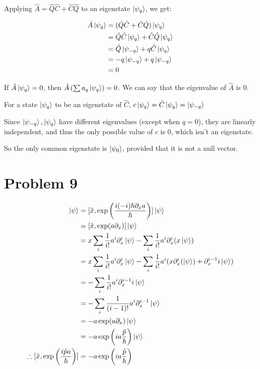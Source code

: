 \documentclass[12pt]{article}
\begin{document}
Applying $\hat{A}=\hat{Q}\hat{C}+\hat{C}\hat{Q}$ to an eigenstate $\Ket{\psi_q}$, we get:

\begin{align*}
\hat{A}\Ket{\psi_q} &=(\hat{Q}\hat{C}+\hat{C}\hat{Q})\Ket{\psi_q}\\
&= \hat{Q}\hat{C}\Ket{\psi_q}+\hat{C}\hat{Q}\Ket{\psi_q} \\
&= \hat{Q}\Ket{\psi_{-q}}+q\hat{C}\Ket{\psi_q}\\
&= -q\Ket{\psi_{-q}}+q\Ket{\psi_{-q}}\\
&=0
\end{align*}

If $\hat A\Ket{\psi_q}=0$, then $\hat A\left(\sum a_q\Ket{\psi_q}\right)=0$. We can say that the eigenvalue of $\hat A$ is 0.

For a state $\Ket{\psi_q}$ to be an eigenstate of $\hat C$, $c\Ket{\psi_q}=\hat C\Ket{\psi_q}=\Ket{\psi_{-q}}$

Since $\Ket{\psi_{-q}},\Ket{\psi_q}$ have different eigenvalues (except when $q=0$), they are linearly independent, and thus the  only possible value of $c$ is 0, which isn't an eigenstate.

So the only common eigenstate is $\Ket{\psi_0}$, provided that it is not a null vector.
\section*{Problem 9}
\newcommand{\kpsi}{\Ket{\psi}}
\begin{align*}
[\hat x, \exp\left(\frac{i\hat p a}{\hbar}\right)]\kpsi &= [\hat x, \exp\left(\frac{i(-i)\hbar\partial_x a}{\hbar}\right)]\kpsi\\
&=[\hat x, \exp(a\partial_x)]\kpsi\\
&=  x \sum_i \frac1{i!}a^i\partial^i_x\kpsi - \sum_i\frac1{i!} a^i\partial^i_x (x\kpsi) \\
&=  x \sum_i \frac1{i!}a^i\partial^i_x\kpsi - \sum_i\frac1{i!} a^i(x\partial^i_x (\kpsi) + \partial_x^{i-1}i\kpsi)\\
&= - \sum_i\frac1{i!} a^i \partial_x^{i-1}i\kpsi\\
&= - \sum_i\frac1{(i-1)!} a^i \partial_x^{i-1}\kpsi\\
&= - a\exp(a\partial_x)\Ket{\psi}\\
&= -a\exp\left(ia\frac{\hat p}{\hbar}\right)\kpsi\\
\therefore [\hat x, \exp\left(\frac{i\hat p a}{\hbar}\right)] &= -a\exp\left(ia\frac{\hat p}{\hbar}\right)
\end{align*}
\end{document}
